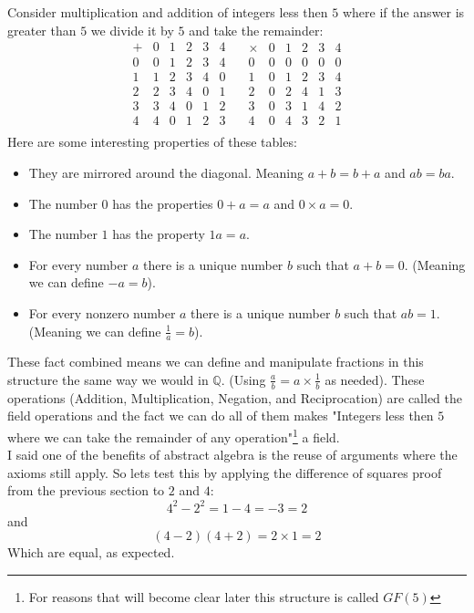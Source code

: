 \label{intro:gf5}
Consider multiplication and addition of integers less then $5$ where if the answer is greater than $5$ we divide it by $5$ and take the remainder:
\[
\begin{array}{c|ccccc}
	+& 0 & 1& 2 &3 &4 \\
	\hline 
	0&0&1&2&3&4\\
	1&1&2&3&4&0\\
	2&2&3&4&0&1\\
	3&3&4&0&1&2\\
	4&4&0&1&2&3\\
\end{array}
\quad
\begin{array}{c|ccccc}
	\times & 0 & 1& 2 &3 &4 \\
	\hline 
	0&0&0&0&0&0\\
	1&0&1&2&3&4\\
	2&0&2&4&1&3\\
	3&0&3&1&4&2\\
	4&0&4&3&2&1\\
\end{array}
\]
Here are some interesting properties of these tables:
\begin{itemize}
	\item They are mirrored around the diagonal. Meaning $a+b = b+a$ and $ab = ba$.
	\item The number $0$ has the properties $0+a = a$ and $0\times a = 0$.
	\item The number $1$ has the property $1a = a$.
	\item For every number $a$ there is a unique number $b$ such that $a+b = 0$. (Meaning we can define $-a = b$).
	\item For every nonzero number $a$ there is a unique number $b$ such that $ab = 1$. (Meaning we can define $\frac{1}{a} = b$).
\end{itemize}
These fact combined means we can define and manipulate fractions in this structure the same way we would in $\mathbb{Q}$.
(Using $\frac{a}{b} = a\times\frac{1}{b}$ as needed).
These operations (Addition, Multiplication, Negation, and Reciprocation) are called the field operations and the fact we can do all of them makes "Integers less then $5$ where we can take the remainder of any operation"\footnote{For reasons that will become clear later this structure is called $GF(5)$} a field.
\\

I said one of the benefits of abstract algebra is the reuse of arguments where the axioms still apply.
So lets test this by applying the difference of squares proof from the previous section to $2$ and $4$:
\[4^2-2^2 = 1 - 4 = -3 = 2\]
and 
\[(4-2)(4+2) = 2\times1 = 2\]
Which are equal, as expected.
\\

